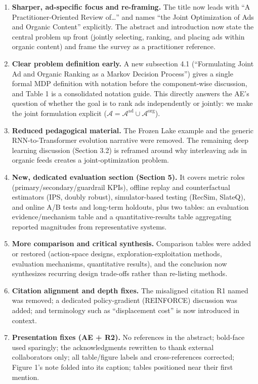 \documentclass[11pt]{article}
\begin{document}
\begin{enumerate}
\item \textbf{Sharper, ad-specific focus and re-framing.} The title now leads
  with ``A Practitioner-Oriented Review of\dots'' and names ``the Joint
  Optimization of Ads and Organic Content'' explicitly. The abstract and
  introduction now state the central problem up front (jointly selecting,
  ranking, and placing ads within organic content) and frame the survey as a
  practitioner reference.

\item \textbf{Clear problem definition early.} A new subsection 4.1
  (``Formulating Joint Ad and Organic Ranking as a Markov Decision Process'')
  gives a single formal MDP definition with notation before the component-wise
  discussion, and Table 1 is a consolidated notation guide. This directly
  answers the AE's question of whether the goal is to rank ads independently or
  jointly: we make the joint formulation explicit
  (\(\mathcal{A} = \mathcal{A}^{\mathrm{ad}} \cup \mathcal{A}^{\mathrm{org}}\)).

\item \textbf{Reduced pedagogical material.} The Frozen Lake example and the
  generic RNN-to-Transformer evolution narrative were removed. The remaining
  deep learning discussion (Section 3.2) is reframed around why interleaving
  ads in organic feeds creates a joint-optimization problem.

\item \textbf{New, dedicated evaluation section (Section 5).} It covers metric
  roles (primary/secondary/guardrail KPIs), offline replay and counterfactual
  estimators (IPS, doubly robust), simulator-based testing (RecSim, SlateQ),
  and online A/B tests and long-term holdouts, plus two tables: an evaluation
  evidence/mechanism table and a quantitative-results table aggregating
  reported magnitudes from representative systems.

\item \textbf{More comparison and critical synthesis.} Comparison tables were
  added or restored (action-space designs, exploration-exploitation methods,
  evaluation mechanisms, quantitative results), and the conclusion now
  synthesizes recurring design trade-offs rather than re-listing methods.

\item \textbf{Citation alignment and depth fixes.} The misaligned citation R1
  named was removed; a dedicated policy-gradient (REINFORCE) discussion was
  added; and terminology such as ``displacement cost'' is now introduced in
  context.

\item \textbf{Presentation fixes (AE + R2).} No references in the abstract;
  bold-face used sparingly; the acknowledgments rewritten to thank external
  collaborators only; all table/figure labels and cross-references corrected;
  Figure 1's note folded into its caption; tables positioned near their first
  mention.
\end{enumerate}
\end{document}
